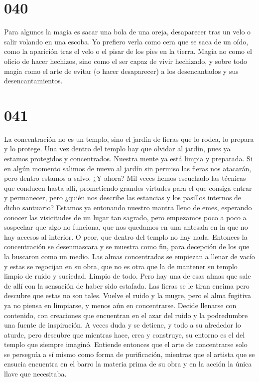 \documentclass[a4paper,11pt,openright,twocolumn]{book}
\begin{document}
\section*{040}

Para algunos la magia es sacar una bola de una oreja, desaparecer tras un velo o salir volando en una escoba. Yo prefiero verla como cera que se saca de un oído, como la aparición tras el velo o el pisar de los pies en la tierra. Magia no como el oficio de hacer hechizos, sino como el ser capaz de vivir hechizado, y sobre todo magia como el arte de evitar (o hacer desaparecer) a los desencantados y sus desencantamientos.

\section*{041}

La concentración no es un templo, sino el jardín de fieras que lo rodea, lo prepara y lo protege. Una vez dentro del templo hay que olvidar al jardín, pues ya estamos protegidos y concentrados. Nuestra mente ya está limpia y preparada. Si en algún momento salimos de nuevo al jardín sin permiso las fieras nos atacarán, pero dentro estamos a salvo. ¿Y ahora? Mil veces hemos escuchado las técnicas  que conducen hasta allí, prometiendo grandes virtudes para el que consiga entrar y permanecer, pero ¿quién nos describe las estancias y los pasillos internos de dicho santuario? Estamos ya entonando nuestro mantra lleno de emes, esperando conocer las visicitudes de un lugar tan sagrado, pero empezamos poco a poco a sospechar que algo no funciona, que nos quedamos en una antesala en la que no hay accesos al interior. O peor, que dentro del templo no hay nada. Entonces la concentración se desenmascara y se muestra como fin, para decepción de los que la buscaron como un medio. Las almas concentradas se empiezan a llenar de vacío y estas se regocijan en su obra, que no es otra que la de mantener su templo limpio de ruido y suciedad. Limpio de todo. Pero hay una de esas almas que sale de allí con la sensación de haber sido estafada. Las fieras se le tiran encima pero descubre que estas no son tales. Vuelve el ruido y la mugre, pero el alma fugitiva ya no piensa en limpiarse, y menos aún en concentrarse. Decide llenarse con contenido, con creaciones que encuentran en el azar del ruido y la podredumbre una fuente de inspiración. A veces duda y se detiene, y todo a su alrededor lo aturde, pero descubre que mientras hace, crea y construye, su entorno es el del templo que siempre imaginó. Entiende entonces que el arte de concentrarse solo se perseguía a sí mismo como forma de purificación, mientras que el artista que se ensucia encuentra en el barro la materia prima de su obra y en la acción la única llave que necesitaba. 
\end{document}
